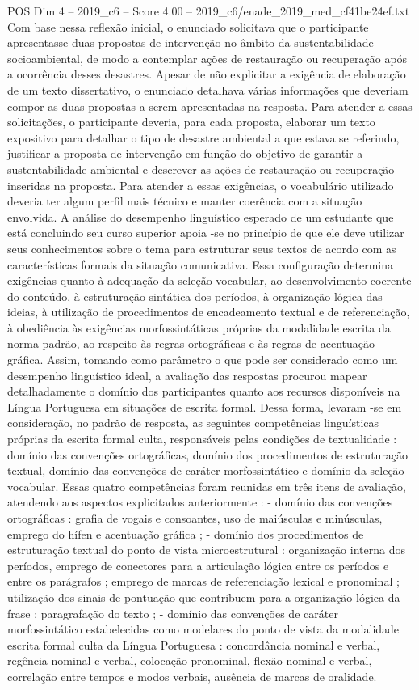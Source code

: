 \begin{textsample}{POS Dim 4 – 2019\_c6 – Score 4.00 – 2019\_c6/enade\_2019\_med\_cf41be24ef.txt}
Com base nessa reflexão inicial, o enunciado solicitava que o participante apresentasse duas propostas de intervenção no âmbito da sustentabilidade socioambiental, de modo a contemplar ações de restauração ou recuperação após a ocorrência desses desastres.
Apesar de não explicitar a exigência de elaboração de um texto dissertativo, o enunciado detalhava várias informações que deveriam compor as duas propostas a serem apresentadas na resposta.
Para atender a essas solicitações, o participante deveria, para cada proposta, elaborar um texto expositivo para detalhar o tipo de desastre ambiental a que estava se referindo, justificar a proposta de intervenção em função do objetivo de garantir a sustentabilidade ambiental e descrever as ações de restauração ou recuperação inseridas na proposta.
Para atender a essas exigências, o vocabulário utilizado deveria ter algum perfil mais técnico e manter coerência com a situação envolvida.
A análise do desempenho linguístico esperado de um estudante que está concluindo seu curso superior apoia -se no princípio de que ele deve utilizar seus conhecimentos sobre o tema para estruturar seus textos de acordo com as características formais da situação comunicativa.
Essa configuração determina exigências quanto à adequação da seleção vocabular, ao desenvolvimento coerente do conteúdo, à estruturação sintática dos períodos, à organização lógica das ideias, à utilização de procedimentos de encadeamento textual e de referenciação, à obediência às exigências morfossintáticas próprias da modalidade escrita da norma-padrão, ao respeito às regras ortográficas e às regras de acentuação gráfica.
Assim, tomando como parâmetro o que pode ser considerado como um desempenho linguístico ideal, a avaliação das respostas procurou mapear detalhadamente o domínio dos participantes quanto aos recursos disponíveis na Língua Portuguesa em situações de escrita formal.
Dessa forma, levaram -se em consideração, no padrão de resposta, as seguintes competências linguísticas próprias da escrita formal culta, responsáveis pelas condições de textualidade : domínio das convenções ortográficas, domínio dos procedimentos de estruturação textual, domínio das convenções de caráter morfossintático e domínio da seleção vocabular.
Essas quatro competências foram reunidas em três itens de avaliação, atendendo aos aspectos explicitados anteriormente : - domínio das convenções ortográficas : grafia de vogais e consoantes, uso de maiúsculas e minúsculas, emprego do hífen e acentuação gráfica ; - domínio dos procedimentos de estruturação textual do ponto de vista microestrutural : organização interna dos períodos, emprego de conectores para a articulação lógica entre os períodos e entre os parágrafos ; emprego de marcas de referenciação lexical e pronominal ; utilização dos sinais de pontuação que contribuem para a organização lógica da frase ; paragrafação do texto ; - domínio das convenções de caráter morfossintático estabelecidas como modelares do ponto de vista da modalidade escrita formal culta da Língua Portuguesa : concordância nominal e verbal, regência nominal e verbal, colocação pronominal, flexão nominal e verbal, correlação entre tempos e modos verbais, ausência de marcas de oralidade.

\end{textsample}
